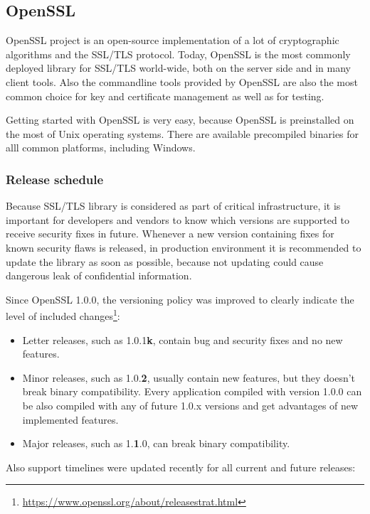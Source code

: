 \subsection{OpenSSL}

OpenSSL project is an open-source implementation of a lot of cryptographic algorithms and the SSL/TLS protocol. Today, OpenSSL is the most commonly deployed library for SSL/TLS world-wide, both on the server side and in many client tools. Also the commandline tools provided by OpenSSL are also the most common choice for key and certificate management as well as for testing.

Getting started with OpenSSL is very easy, because OpenSSL is preinstalled on the most of Unix operating systems. There are available precompiled binaries for alll common platforms, including Windows.

\subsubsection{Release schedule}

Because SSL/TLS library is considered as part of critical infrastructure, it is important for developers and vendors to know which versions are supported to receive security fixes in future. Whenever a new version containing fixes for known security flaws is released, in production environment it is recommended to update the library as soon as possible, because not updating could cause dangerous leak of confidential information.

Since OpenSSL 1.0.0, the versioning policy was improved to clearly indicate the level of included changes\footnote{\url{https://www.openssl.org/about/releasestrat.html}}:

\begin{itemize}
  \item Letter releases, such as 1.0.1\textbf{k}, contain bug and security fixes and no new features.
  \item Minor releases, such as 1.0.\textbf{2}, usually contain new features, but they doesn't break binary compatibility. Every application compiled with version 1.0.0 can be also compiled with any of future 1.0.x versions and get advantages of new implemented features.
  \item Major releases, such as 1.\textbf{1}.0, can break binary compatibility.
\end{itemize}

Also support timelines were updated recently for all current and future releases:

